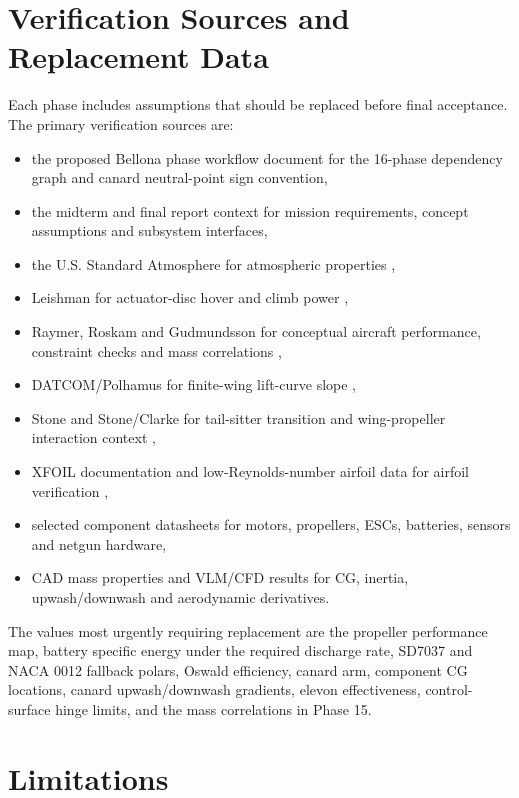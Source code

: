 \section{Verification Sources and Replacement Data}
\label{sec:ppa_verification_sources}

Each phase includes assumptions that should be replaced before final acceptance. The primary verification sources are:
\begin{itemize}[leftmargin=*]
    \item the proposed Bellona phase workflow document for the 16-phase dependency graph and canard neutral-point sign convention,
    \item the midterm and final report context for mission requirements, concept assumptions and subsystem interfaces,
    \item the U.S. Standard Atmosphere for atmospheric properties \cite{NOAA1976U.S.1976},
    \item Leishman for actuator-disc hover and climb power \cite{Leishman2006},
    \item Raymer, Roskam and Gudmundsson for conceptual aircraft performance, constraint checks and mass correlations \cite{Raymer2018,Roskam1985PartVI,Gudmundsson2014},
    \item DATCOM/Polhamus for finite-wing lift-curve slope \cite{USAFDATCOM1978,Polhamus1958},
    \item Stone and Stone/Clarke for tail-sitter transition and wing-propeller interaction context \cite{Stone1999,StoneClarke2001,Stone2008},
    \item XFOIL documentation and low-Reynolds-number airfoil data for airfoil verification \cite{Drela1989XFOIL,DrelaYoungrenXFOILweb,SeligUIUCVol1},
    \item selected component datasheets for motors, propellers, ESCs, batteries, sensors and netgun hardware,
    \item CAD mass properties and VLM/CFD results for CG, inertia, upwash/downwash and aerodynamic derivatives.
\end{itemize}

The values most urgently requiring replacement are the propeller performance map, battery specific energy under the required discharge rate, SD7037 and NACA 0012 fallback polars, Oswald efficiency, canard arm, component CG locations, canard upwash/downwash gradients, elevon effectiveness, control-surface hinge limits, and the mass correlations in Phase 15.

\section{Limitations}
\label{sec:ppa_limitations}

